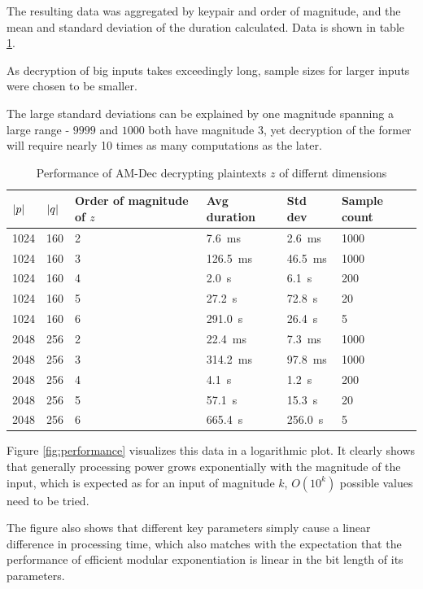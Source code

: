\documentclass[a4paper]{scrreprt}
\DeclarePairedDelimiter\abs{\lvert}{\rvert}
\begin{document}
The resulting data was aggregated by keypair and order of magnitude, and the
mean and standard deviation of the duration calculated. Data is shown in table
\ref{tbl:performance}.

As decryption of big inputs takes exceedingly long, sample sizes for larger
inputs were chosen to be smaller.

The large standard deviations can be explained by one magnitude spanning a large
range - $9999$ and $1000$ both have magnitude $3$, yet decryption of the former
will require nearly 10 times as many computations as the later.

\begin{table}
		\begin{tabular}{llllll}
				\toprule
				$\abs{p}$ & $\abs{q}$ & Order of magnitude of $z$ & Avg duration & Std dev & Sample count \\
				\midrule
				1024 & 160 & 2 & \SI{7.6}{\ms}   & \SI{2.6}{\ms}   & 1000 \\
				1024 & 160 & 3 & \SI{126.5}{\ms} & \SI{46.5}{\ms}  & 1000 \\
				1024 & 160 & 4 & \SI{2.0}{\s}    & \SI{6.1}{\s}    & 200 \\
				1024 & 160 & 5 & \SI{27.2}{\s}   & \SI{72.8}{\s}   & 20 \\
				1024 & 160 & 6 & \SI{291.0}{\s}  & \SI{26.4}{\s}   & 5 \\
				2048 & 256 & 2 & \SI{22.4}{\ms}  & \SI{7.3}{\ms}   & 1000 \\
				2048 & 256 & 3 & \SI{314.2}{\ms} & \SI{97.8}{\ms}  & 1000 \\
				2048 & 256 & 4 & \SI{4.1}{\s}    & \SI{1.2}{\s}    & 200 \\
				2048 & 256 & 5 & \SI{57.1}{\s}   & \SI{15.3}{\s}   & 20 \\
				2048 & 256 & 6 & \SI{665.4}{\s}  & \SI{256.0}{\s}  & 5 \\
				\bottomrule
		\end{tabular}
		\caption{Performance of AM-Dec decrypting plaintexts $z$ of differnt dimensions}
		\label{tbl:performance}
\end{table}

Figure \ref{fig:performance} visualizes this data in a logarithmic plot. It
clearly shows that generally processing power grows exponentially with the
magnitude of the input, which is expected as for an input of magnitude $k$,
$O(10^k)$ possible values need to be tried.

The figure also shows that different key parameters simply cause a linear
difference in processing time, which also matches with the expectation that the
performance of efficient modular exponentiation is linear in the bit length of
its parameters.
\end{document}
